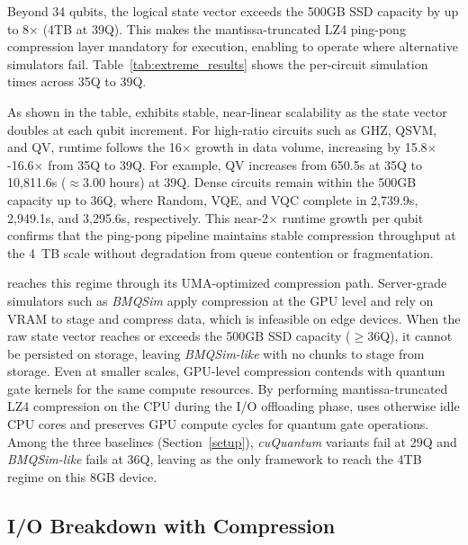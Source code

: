 Beyond 34 qubits, the logical state vector exceeds the 500GB SSD capacity by up to 8$\times$ (4TB at 39Q). This makes the mantissa-truncated LZ4 ping-pong compression layer mandatory for execution, enabling \EdgeQuantum to operate where alternative simulators fail. Table~\ref{tab:extreme_results} shows the per-circuit simulation times across 35Q to 39Q.

As shown in the table, \EdgeQuantum exhibits stable, near-linear scalability as the state vector doubles at each qubit increment. For high-ratio circuits such as GHZ, QSVM, and QV, runtime follows the 16$\times$ growth in data volume, increasing by 15.8$\times$-16.6$\times$ from 35Q to 39Q. For example, QV increases from 650.5s at 35Q to 10,811.6s ($\approx$3.00 hours) at 39Q. Dense circuits remain within the 500GB capacity up to 36Q, where Random, VQE, and VQC complete in 2,739.9s, 2,949.1s, and 3,295.6s, respectively. This near-2$\times$ runtime growth per qubit confirms that the ping-pong pipeline maintains stable compression throughput at the 4~TB scale without degradation from queue contention or fragmentation.

\EdgeQuantum reaches this regime through its UMA-optimized compression path. Server-grade simulators such as \textit{BMQSim} apply compression at the GPU level and rely on VRAM to stage and compress data, which is infeasible on edge devices. When the raw state vector reaches or exceeds the 500GB SSD capacity ($\geq$36Q), it cannot be persisted on storage, leaving \textit{BMQSim-like} with no chunks to stage from storage. Even at smaller scales, GPU-level compression contends with quantum gate kernels for the same compute resources. By performing mantissa-truncated LZ4 compression on the CPU during the I/O offloading phase, \EdgeQuantum uses otherwise idle CPU cores and preserves GPU compute cycles for quantum gate operations. Among the three baselines (Section~\ref{setup}), \textit{cuQuantum} variants fail at 29Q and \textit{BMQSim-like} fails at 36Q, leaving \EdgeQuantum as the only framework to reach the 4TB regime on this 8GB device.

\subsection{I/O Breakdown with Compression}\label{sec:io_breakdown_compressed}

